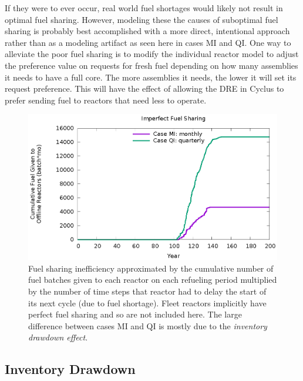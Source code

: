 \documentclass{style}
\begin{document}
If they were to ever occur, real world fuel shortages would likely not result
in optimal fuel sharing. However, modeling these the causes of suboptimal fuel
sharing is probably best accomplished with a more direct, intentional approach
rather than as a modeling artifact as seen here in cases MI and QI.  One way to
alleviate the poor fuel sharing is to modify the individual reactor model to
adjust the preference value on requests for fresh fuel depending on how many
assemblies it needs to have a full core.  The more assemblies it needs, the
lower it will set its request preference.  This will have the effect of
allowing the DRE in Cyclus to prefer sending
fuel to reactors that need less to operate.

\begin{figure}[!h]
    \centering
    \includegraphics[width=1.0\columnwidth]{exp2/badshare.eps}
    \caption[Cumulative unnecessary idling fuel]{
        Fuel sharing inefficiency approximated by the cumulative number of
        fuel batches given to each reactor on each refueling period multiplied
        by the number of time steps that reactor had to delay the start of its
        next cycle (due to fuel shortage).  Fleet reactors implicitly have perfect fuel
        sharing and so are not included here. The large difference
        between cases MI and QI is mostly due to the \emph{inventory drawdown
        effect}. 
    }
    \label{fig:badshare}
\end{figure}

\subsection{Inventory Drawdown}
\end{document}

